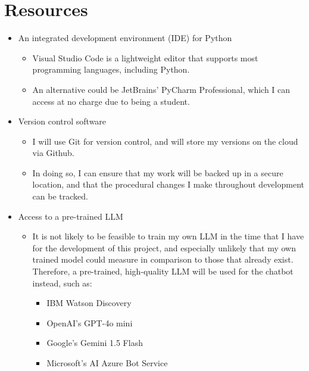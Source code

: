 \documentclass[12pt]{report}
\begin{document}
    \section{Resources}
    \begin{itemize}
        \item An integrated development environment (IDE) for Python
        \begin{itemize}
            \item Visual Studio Code is a lightweight editor that supports most programming languages,
            including Python.
            \item An alternative could be JetBrains' PyCharm Professional, which I can access at no charge due
            to being a student.
        \end{itemize}

        \item Version control software
        \begin{itemize}
            \item I will use Git for version control, and will store my versions on the cloud via Github. 
            \item In doing so, I can ensure that my work will be backed up in a secure location, and that the 
            procedural changes I make throughout development can be tracked.
        \end{itemize}

        \item Access to a pre-trained LLM
        \begin{itemize}
            \item It is not likely to be feasible to train my own LLM in the time that I have for the development 
            of this project, and especially unlikely that my own trained model could measure in comparison to those
            that already exist. Therefore, a pre-trained, high-quality LLM will be used for the chatbot
            instead, such as:
            \begin{itemize}
                \item IBM Watson Discovery
                \item OpenAI's GPT-4o mini
                \item Google's Gemini 1.5 Flash
                \item Microsoft's AI Azure Bot Service
            \end{itemize} 
        \end{itemize}


\end{itemize}
\end{document}
